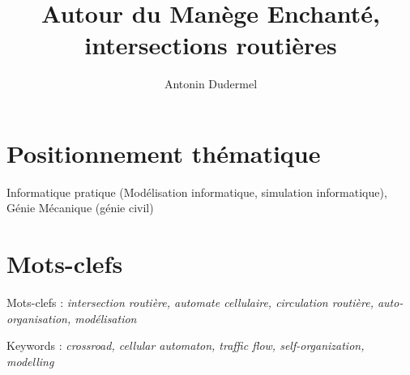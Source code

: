 \documentclass[11pt,a4paper,french]{article}
\title{Autour du Manège Enchanté,\\
intersections routières}
\date{}
\author{Antonin Dudermel}
\begin{document}

\maketitle

\section*{Positionnement thématique}
Informatique pratique (Modélisation informatique, simulation informatique), Génie Mécanique (génie civil)

\section*{Mots-clefs}
Mots-clefs : {\it intersection routière, automate cellulaire, circulation routière, auto-organisation, modélisation} \par
Keywords : {\it crossroad, cellular automaton, traffic flow, self-organization, modelling}
\end{document}
